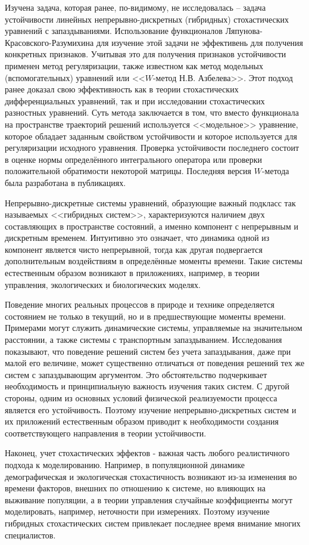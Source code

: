 Изучена задача, которая ранее, по-видимому, не исследовалась --
задача устойчивости линейных непрерывно-дискретных (гибридных)
стохастических уравнений с запаздываниями. Использование
функционалов Ляпунова-Красовского-Разумихина для изучение этой
задачи не эффективень  для получения конкретных признаков. Учитывая
это для получения признаков устойчивости применен метод
регуляризации, также известном как метод модельных (вспомогательных)
уравнений или <<$W$-метод Н.В. Азбелева>>. Этот подход ранее доказал
свою эффективность как в теории стохастических дифференциальных
уравнений, так и при исследовании стохастических разностных
уравнений. Суть метода заключается в том, что вместо функционала на
пространстве траекторий решений используется <<модельное>>
уравнение, которое обладает заданным свойством устойчивости и
которое используется для регуляризации исходного уравнения. Проверка
устойчивости последнего состоит в оценке нормы определённого
интегрального оператора или проверки положительной обратимости
некоторой матрицы. Последняя версия $W$-метода была разработана в
публикациях.

Непрерывно-дискретные системы уравнений, образующие важный подкласс так называемых <<гибридных систем>>, характеризуются наличием двух составляющих в пространстве состояний, а именно компонент с непрерывным и дискретным временем. Интуитивно
это означает, что динамика одной из компонент является чисто
непрерывной, тогда как другая подвергается дополнительным
воздействиям в определённые моменты времени. Такие системы
естественным образом возникают в приложениях, например, в теории
управления, экологических   и биологических моделях.

Поведение многих реальных процессов в природе и технике определяется
состоянием не только в текущий, но и в предшествующие моменты
времени. Примерами могут служить динамические системы, управляемые
на значительном расстоянии, а также системы с транспортным
запаздыванием. Исследования показывают, что поведение решений систем
без учета запаздывания, даже при малой его величине, может
существенно отличаться от поведения решений тех же систем с
запаздывающим аргументом. Это обстоятельство подчеркивает
необходимость и принципиальную важность изучения таких систем. С
другой стороны, одним из основных условий физической реализуемости
процесса является его устойчивость. Поэтому изучение непрерывно-дискретных
систем и их приложений естественным образом приводит к необходимости
создания соответствующего направления в теории устойчивости.

Наконец, учет стохастических эффектов - важная часть любого
реалистичного подхода к моделированию. Например, в популяционной
динамике демографическая и экологическая стохастичность возникают
из-за изменения во времени факторов, внешних по отношению к системе,
но влияющих на выживание популяции, а в теории управления случайные
коэффициенты могут моделировать, например, неточности при
измерениях. Поэтому изучение гибридных стохастических систем
привлекает последнее время внимание многих специалистов.


